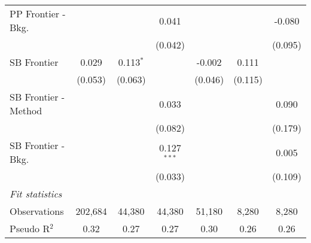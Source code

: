 \begin{tabular}{lcccccc}
   PP Frontier - Bkg.   &               &               & 0.041         &               &               & -0.080\\   
                        &               &               & (0.042)       &               &               & (0.095)\\   
   SB Frontier          & 0.029         & 0.113$^{*}$   &               & -0.002        & 0.111         &   \\   
                        & (0.053)       & (0.063)       &               & (0.046)       & (0.115)       &   \\   
   SB Frontier - Method &               &               & 0.033         &               &               & 0.090\\   
                        &               &               & (0.082)       &               &               & (0.179)\\   
   SB Frontier - Bkg.   &               &               & 0.127$^{***}$ &               &               & 0.005\\   
                        &               &               & (0.033)       &               &               & (0.109)\\   
   \midrule
   \emph{Fit statistics}\\
   Observations         & 202,684       & 44,380        & 44,380        & 51,180        & 8,280         & 8,280\\  
   Pseudo R$^2$         & 0.32          & 0.27          & 0.27          & 0.30          & 0.26          & 0.26\\  
   

\end{tabular}
